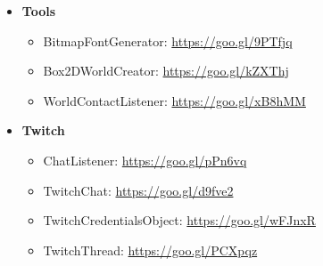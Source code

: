 \documentclass[12p]{article}
\begin{document}
\begin{itemize}
    \item \textbf{Tools}
    \begin{itemize}
        \item BitmapFontGenerator: \url{https://goo.gl/9PTfjq}
        \item Box2DWorldCreator: \url{https://goo.gl/kZXThj}
        \item WorldContactListener: \url{https://goo.gl/xB8hMM}
    \end{itemize}
    
    \item \textbf{Twitch}
    \begin{itemize}
        \item ChatListener: \url{https://goo.gl/pPn6vq}
        \item TwitchChat: \url{https://goo.gl/d9fve2}
        \item TwitchCredentialsObject: \url{https://goo.gl/wFJnxR}
        \item TwitchThread: \url{https://goo.gl/PCXpqz}
    \end{itemize}
\end{itemize}

\end{document}
